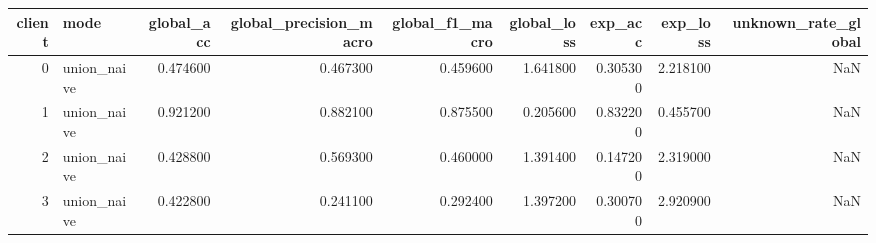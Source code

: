 \begin{tabular}{rlrrrrrrr}
\toprule
client & mode & global_acc & global_precision_macro & global_f1_macro & global_loss & exp_acc & exp_loss & unknown_rate_global \\
\midrule
0 & union_naive & 0.474600 & 0.467300 & 0.459600 & 1.641800 & 0.305300 & 2.218100 & NaN \\
1 & union_naive & 0.921200 & 0.882100 & 0.875500 & 0.205600 & 0.832200 & 0.455700 & NaN \\
2 & union_naive & 0.428800 & 0.569300 & 0.460000 & 1.391400 & 0.147200 & 2.319000 & NaN \\
3 & union_naive & 0.422800 & 0.241100 & 0.292400 & 1.397200 & 0.300700 & 2.920900 & NaN \\
\bottomrule
\end{tabular}
